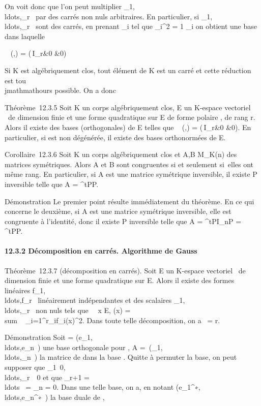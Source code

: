 \documentclass[]{article}
\begin{document}
On voit donc que l'on peut multiplier
\alpha_1,\\ldots,\alpha_r~
par des carrés non nuls arbitraires. En particulier, si
\alpha_1,\\ldots,\alpha_r~
sont des carrés, en prenant \lambda_i tel que \lambda_i^2
= 1 \over \alpha_i on obtient une base dans
laquelle

\mathrmMat~ (\phi,) =
\left
(\matrix\,I_r&0
 &0\right )

Si K est algébriquement clos, tout élément de K est un carré et cette
réduction est tou\\jmathmathours possible. On a donc

Théorème~12.3.5 Soit K un corps algébriquement clos, E un K-espace
vectoriel ~de dimension finie et \Phi une forme quadratique sur E de forme
polaire \phi, de rang r. Alors il existe des bases (orthogonales) de E
telles que \mathrmMat~ (\phi,)
= \left
(\matrix\,I_r&0
 &0\right ). En particulier, si \Phi
est non dégénérée, il existe des bases orthonormées de E.

Corollaire~12.3.6 Soit K un corps algébriquement clos et A,B \in
M_K(n) des matrices symétriques. Alors A et B sont congruentes
si et seulement si~elles ont même rang. En particulier, si A est une
matrice symétrique inversible, il existe P inversible telle que A =
^tPP.

Démonstration Le premier point résulte immédiatement du théorème. En ce
qui concerne le deuxième, si A est une matrice symétrique inversible,
elle est congruente à l'identité, donc il existe P inversible telle que
A = ^tPI_nP = ^tPP.

\paragraph{12.3.2 Décomposition en carrés. Algorithme de Gauss}

Théorème~12.3.7 (décomposition en carrés). Soit E un K-espace vectoriel
~de dimension finie et \Phi une forme quadratique sur E. Alors il existe
des formes linéaires
f_1,\\ldots,f_r~
linéairement indépendantes et des scalaires
\alpha_1,\\ldots,\alpha_r~
non nuls tels que \forall~~x \in E, \Phi(x)
= \\sum ~
_i=1^r\alpha_if_i(x)^2. Dans toute
telle décomposition, on a
\mathrmrg~\Phi = r.

Démonstration Soit  =
(e_1,\\ldots,e_n~)
une base orthogonale pour \Phi, A =\
\mathrmdiag(\alpha_1,\\ldots,\alpha_n~)
la matrice de \Phi dans la base . Quitte à permuter la base, on peut
supposer que
\alpha_1\neq~0,\\ldots,\alpha_r\mathrel\neq~~0
et que \alpha_r+1 =
\\ldots~ =
\alpha_n = 0. Dans une telle base, on a, en notant
(e_1^∗,\\ldots,e_n^∗~)
la base duale de ,
\end{document}
